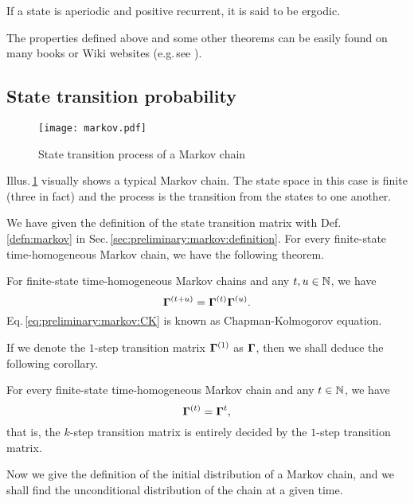 		\begin{defn}
		\label{defn:markov:ergodicity}
		If a state is aperiodic and positive recurrent,
		it is said to be ergodic.
		\end{defn}
The properties defined above and some other theorems can be easily found on 
many books or Wiki websites (e.g.\,see \cite{wiki:markov,Kemeny:1960mc,Meyn2012:mc}).


\subsection{State transition probability}
\label{sec:preliminary:markov:transition}
        \begin{figure}[!hbt]
        \center
        \texttt{[image: markov.pdf]}
        \caption{State transition process of a Markov chain}
        \label{fig:markov:transition}
        \end{figure}
Illus.\,\ref{fig:markov:transition} visually shows a typical Markov chain.
The state space in this case is finite (three in fact) and 
the process is the transition from the states to one another.

We have given the definition of the state transition matrix 
with Def.\,\ref{defn:markov} in Sec.\,\ref{sec:preliminary:markov:definition}.
For every finite-state time-homogeneous Markov chain, 
we have the following theorem.

		\begin{thm}
		\label{thm:CK}
		For finite-state time-homogeneous Markov chains and any $t,u \in {\mathbb N}$, we have
			\begin{equation}
			\label{eq:preliminary:markov:CK}
			{\boldsymbol\Gamma}^{(t+u)} = {\boldsymbol\Gamma}^{(t)}{\boldsymbol\Gamma}^{(u)}.
			\end{equation}
		Eq.\,\ref{eq:preliminary:markov:CK} is known as Chapman-Kolmogorov equation.
		\end{thm}
If we denote the $1$-step transition matrix ${\boldsymbol\Gamma}^{(1)}$ as ${\boldsymbol\Gamma}$, 
then we shall deduce the following corollary.
		
		\begin{cor}
		\label{cor:CK}
		For every finite-state time-homogeneous Markov chain and any $t \in {\mathbb N}$, we have
			\begin{equation}
			\label{eq:preliminary:markov:CK_2}
			{\boldsymbol\Gamma}^{(t)} = {\boldsymbol\Gamma}^t,
			\end{equation}
		that is, the $k$-step transition matrix is entirely decided by the $1$-step transition matrix.
		\end{cor}
Now we give the definition of the initial distribution of a Markov chain,
and we shall find the unconditional distribution of the chain at a given time.

